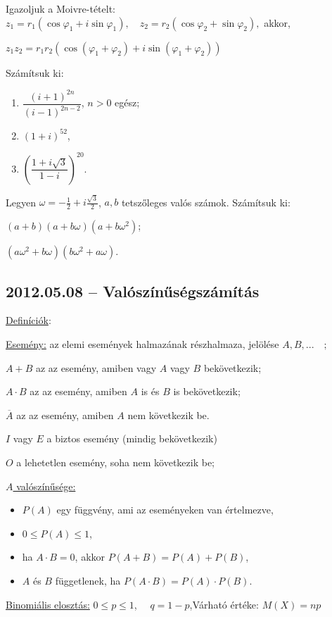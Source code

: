 \documentclass{article}
\newenvironment{abc}{\begin{enumerate}[label=\textit{\alph*})]}{\end{enumerate}}
\newenvironment{abc2}{\begin{enumerate}[label=\textit{\alph*})]\begin{multicols}{2}}{\end{multicols}\end{enumerate}}
\begin{document}
\begin{enumerate}
\item Igazoljuk a Moivre-tételt: $z_1=r_1(\cos\varphi_1+ i \sin\varphi_1),\quad z_2=r_2(\cos\varphi_2+\sin\varphi_2),$ akkor,

$z_1z_2=r_1r_2(\cos(\varphi_1+\varphi_2)+i \sin (\varphi_1+\varphi_2))$
\item Számítsuk ki:
\begin{abc}
\item $\dfrac{(i+1)^{2n}}{(i-1)^{2n-2}}$, $n>0$ egész;
\item $(1+i)^{52}$,
\item $\left(\dfrac{1+i\sqrt{3}}{1-i}\right)^{20}$.
\end{abc}
\item Legyen $\omega=-\frac{1}{2}+i\frac{\sqrt{3}}{2}$, $a,b$ tetszőleges valós számok. Számítsuk ki:
\begin{abc2}
\item $(a+b)(a+b\omega)(a+b\omega^2)$;
\item $(a\omega^2+b\omega)(b\omega^2+a\omega)$.
\end{abc2}
\end{enumerate}

\subsection*{2012.05.08 -- Valószínűségszámítás}
\underline{Definíciók}:

\underline{Esemény:} az elemi események halmazának részhalmaza, jelölése $A,B, ...\quad;$

$A+B$ az az esemény, amiben vagy $A$ vagy $B$ bekövetkezik;

$A\cdot B$ az az esemény, amiben $A$ is és $B$ is bekövetkezik;

$\overline{A}$ az az esemény, amiben $A$ nem következik be.

$I$ vagy $E$ a biztos esemény (mindig bekövetkezik)

$O$ a lehetetlen esemény, soha nem következik be;

\underline{$A$ valószínűsége:}
\begin{itemize}
\item $P(A)$ egy függvény, ami az eseményeken van értelmezve, 
\item $0\leq P(A) \leq 1$, 
\item ha $A\cdot B=0$, akkor $P(A+B)=P(A)+P(B)$, 
\item $A$ és $B$ függetlenek, ha $P(A\cdot B)=P(A)\cdot P(B)$. 
\end{itemize}
\underline{Binomiális elosztás:} $0\leq p \leq 1$,$\quad$ $q=1-p$,\qquad Várható értéke: $M(X)=np$
\end{document}
